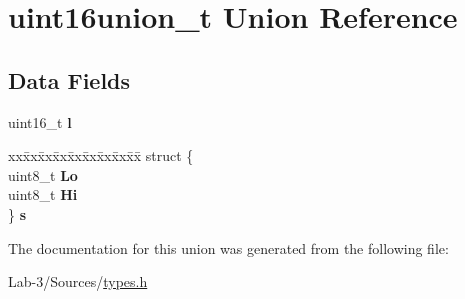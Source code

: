 \hypertarget{unionuint16union__t}{}\section{uint16union\+\_\+t Union Reference}
\label{unionuint16union__t}
\subsection*{Data Fields}
\begin{DoxyCompactItemize}
\item 
\mbox{\label{unionuint16union__t_a16cd113ebebc840282cf932d933469a4}} 
uint16\+\_\+t {\bfseries l}
\item 
\mbox{\label{unionuint16union__t_aca1f20378a7e7e1e236da2360c32a768}} 
\begin{tabbing}
xx\=xx\=xx\=xx\=xx\=xx\=xx\=xx\=xx\=\kill
struct \{\\
\>uint8\_t {\bfseries Lo}\\
\>uint8\_t {\bfseries Hi}\\
\} {\bfseries s}\\

\end{tabbing}\end{DoxyCompactItemize}


The documentation for this union was generated from the following file\+:\begin{DoxyCompactItemize}
\item 
Lab-\/3/\+Sources/\hyperlink{types_8h}{types.\+h}\end{DoxyCompactItemize}
